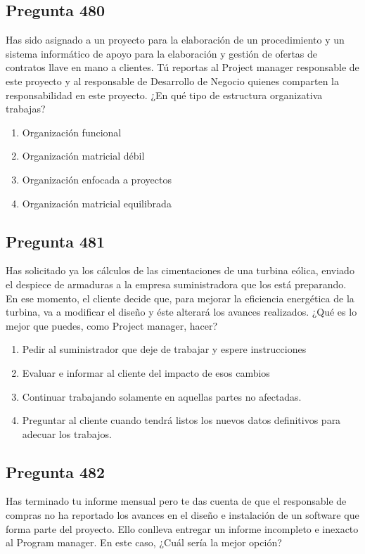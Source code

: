 \documentclass[11pt,a4paper]{article}
\begin{document}
\subsection*{Pregunta 480}
Has sido asignado a un proyecto para la elaboración de un procedimiento y un sistema informático de apoyo para la elaboración y gestión de ofertas de contratos llave en mano a clientes. Tú reportas al Project manager responsable de este proyecto y al responsable de Desarrollo de Negocio quienes comparten la responsabilidad en este proyecto. ¿En qué tipo de estructura organizativa trabajas?

\begin{enumerate}[label=\alph*)]
  \item Organización funcional
  \item Organización matricial débil
  \item Organización enfocada a proyectos
  \item Organización matricial equilibrada
\end{enumerate}

\subsection*{Pregunta 481}
Has solicitado ya los cálculos de las cimentaciones de una turbina eólica, enviado el despiece de armaduras a la empresa suministradora que los está preparando. En ese momento, el cliente decide que, para mejorar la eficiencia energética de la turbina, va a modificar el diseño y éste alterará los avances realizados. ¿Qué es lo mejor que puedes, como Project manager, hacer?

\begin{enumerate}[label=\alph*)]
  \item Pedir al suministrador que deje de trabajar y espere instrucciones
  \item Evaluar e informar al cliente del impacto de esos cambios
  \item Continuar trabajando solamente en aquellas partes no afectadas.
  \item Preguntar al cliente cuando tendrá listos los nuevos datos definitivos para adecuar los trabajos.
\end{enumerate}

\subsection*{Pregunta 482}
Has terminado tu informe mensual pero te das cuenta de que el responsable de compras no ha reportado los avances en el diseño e instalación de un software que forma parte del proyecto. Ello conlleva entregar un informe incompleto e inexacto al Program manager. En este caso, ¿Cuál sería la mejor opción?
\end{document}
